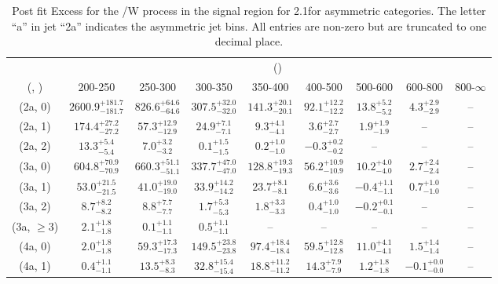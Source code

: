 \begin{table}[h!]
\tiny
\centering
\caption{Post fit Excess for the \ttbar/W process in the signal region for 2.1\ifb for asymmetric categories. The letter ``a'' in jet \eg ``2a''  indicates the asymmetric jet bins. All entries are non-zero but are truncated to one decimal place.\label{tab:excessseppost_sig_ttw_asym}}
\begin{tabular}
{ccccccccc}
	\hline\hline
	& \multicolumn{8}{c}{\scalht (\gev)} \\ 
	 (\njet,  \nb) & 200-250 & 250-300 & 300-350 & 350-400 & 400-500 & 500-600 & 600-800 & 800-$\infty$ \\ [0.8ex] 
\hline
	(2a, 0) & $2600.9^{+ 181.7 }_{- 181.7 }$ & $826.6^{+ 64.6 }_{- 64.6 }$ & $307.5^{+ 32.0 }_{- 32.0 }$ & $141.3^{+ 20.1 }_{- 20.1 }$ & $92.1^{+ 12.2 }_{- 12.2 }$ & $13.8^{+ 5.2 }_{- 5.2 }$ & $4.3^{+ 2.9 }_{- 2.9 }$ & -- \\[0.5ex] 
	(2a, 1) & $174.4^{+ 27.2 }_{- 27.2 }$ & $57.3^{+ 12.9 }_{- 12.9 }$ & $24.9^{+ 7.1 }_{- 7.1 }$ & $9.3^{+ 4.1 }_{- 4.1 }$ & $3.6^{+ 2.7 }_{- 2.7 }$ & $1.9^{+ 1.9 }_{- 1.9 }$ & -- & -- \\[0.5ex] 
	(2a, 2) & $13.3^{+ 5.4 }_{- 5.4 }$ & $7.0^{+ 3.2 }_{- 3.2 }$ & $0.1^{+ 1.5 }_{- 1.5 }$ & $0.2^{+ 1.0 }_{- 1.0 }$ & $-0.3^{+ 0.2 }_{- 0.2 }$ & -- & -- & -- \\[0.5ex] 
	(3a, 0) & $604.8^{+ 70.9 }_{- 70.9 }$ & $660.3^{+ 51.1 }_{- 51.1 }$ & $337.7^{+ 47.0 }_{- 47.0 }$ & $128.8^{+ 19.3 }_{- 19.3 }$ & $56.2^{+ 10.9 }_{- 10.9 }$ & $10.2^{+ 4.0 }_{- 4.0 }$ & $2.7^{+ 2.4 }_{- 2.4 }$ & -- \\[0.5ex] 
	(3a, 1) & $53.0^{+ 21.5 }_{- 21.5 }$ & $41.0^{+ 19.0 }_{- 19.0 }$ & $33.9^{+ 14.2 }_{- 14.2 }$ & $23.7^{+ 8.1 }_{- 8.1 }$ & $6.6^{+ 3.6 }_{- 3.6 }$ & $-0.4^{+ 1.1 }_{- 1.1 }$ & $0.7^{+ 1.0 }_{- 1.0 }$ & -- \\[0.5ex] 
	(3a, 2) & $8.7^{+ 8.2 }_{- 8.2 }$ & $8.8^{+ 7.7 }_{- 7.7 }$ & $1.7^{+ 5.3 }_{- 5.3 }$ & $1.8^{+ 3.3 }_{- 3.3 }$ & $0.4^{+ 1.0 }_{- 1.0 }$ & $-0.2^{+ 0.1 }_{- 0.1 }$ & -- & -- \\[0.5ex] 
	(3a, $\ge3$) & $2.1^{+ 1.8 }_{- 1.8 }$ & $0.1^{+ 1.1 }_{- 1.1 }$ & $0.5^{+ 1.1 }_{- 1.1 }$ & -- & -- & -- & -- & -- \\[0.5ex] 
	(4a, 0) & $2.0^{+ 1.8 }_{- 1.8 }$ & $59.3^{+ 17.3 }_{- 17.3 }$ & $149.5^{+ 23.8 }_{- 23.8 }$ & $97.4^{+ 18.4 }_{- 18.4 }$ & $59.5^{+ 12.8 }_{- 12.8 }$ & $11.0^{+ 4.1 }_{- 4.1 }$ & $1.5^{+ 1.4 }_{- 1.4 }$ & -- \\[0.5ex] 
	(4a, 1) & $0.4^{+ 1.1 }_{- 1.1 }$ & $13.5^{+ 8.3 }_{- 8.3 }$ & $32.8^{+ 15.4 }_{- 15.4 }$ & $18.8^{+ 11.2 }_{- 11.2 }$ & $14.3^{+ 7.9 }_{- 7.9 }$ & $1.2^{+ 1.8 }_{- 1.8 }$ & $-0.1^{+ 0.0 }_{- 0.0 }$ & -- \\[0.5ex] 

\end{tabular}
\end{table}
